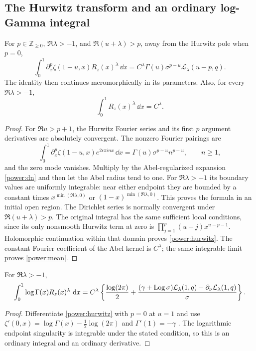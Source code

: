 \subsection{The Hurwitz transform and an ordinary log-Gamma integral}

\begin{theorem}\label{power:hurwitzthm}
For $p\in\mathbb Z_{\ge0}$, $\Re\lambda>-1$, and
$\Re(u+\lambda)>p$, away from the Hurwitz pole when $p=0$,
\begin{equation}\label{power:hurwitz}
 \boxed{\displaystyle
 \int_0^1\partial_x^p\zeta(1-u,x)R_z(x)^\lambda\,\dd x
 =C^\lambda\Gamma(u)\sigma^{p-u}
                    \mathcal L_\lambda(u-p,q).}
\end{equation}
The identity then continues meromorphically in its parameters.  Also,
for every $\Re\lambda>-1$,
\begin{equation}\label{power:mean}
 \int_0^1R_z(x)^\lambda\,\dd x=C^\lambda.
\end{equation}
\end{theorem}

\begin{proof}
For $\Re u>p+1$, the Hurwitz Fourier series and its first $p$
argument derivatives are absolutely convergent.  The nonzero Fourier
pairings are
\[
 \int_0^1\partial_x^p\zeta(1-u,x)e^{2\epsilon\pi inx}\,\dd x
     =\Gamma(u)\sigma^{p-u}n^{p-u},\qquad n\ge1,
\]
and the zero mode vanishes.  Multiply by the Abel-regularized expansion
\eqref{power:dn} and then let the Abel radius tend to one.
For $\Re\lambda>-1$ its boundary values are uniformly integrable:
near either endpoint they are bounded by a constant times
$x^{\min(\Re\lambda,0)}$ or $(1-x)^{\min(\Re\lambda,0)}$.
This proves the formula in an initial open region.  The Dirichlet
series is normally convergent under $\Re(u+\lambda)>p$.
The original integral has the same sufficient local conditions, since
its only nonsmooth Hurwitz term at zero is
$\prod_{j=1}^p(u-j)x^{u-p-1}$.  Holomorphic continuation within
that domain proves \eqref{power:hurwitz}.  The constant Fourier
coefficient of the Abel kernel is $C^\lambda$; the same integrable
limit proves \eqref{power:mean}.
\end{proof}

\begin{corollary}\label{power:gamma}
For $\Re\lambda>-1$,
\begin{align}\label{power:gammaformula}
 \int_0^1\log\Gamma(x)R_z(x)^\lambda\,\mathop{}\!\mathrm{d} x
 =C^\lambda\left\{\frac{\log(2\pi)}2
 +\frac{(\gamma+\operatorname{Log}\sigma)\mathcal L_\lambda(1,q)
       -\partial_\nu\mathcal L_\lambda(1,q)}{\sigma}\right\}.
\end{align}
\end{corollary}
\begin{proof}
Differentiate \eqref{power:hurwitz} with $p=0$ at $u=1$ and use
$\zeta'(0,x)=\log\Gamma(x)-\tfrac12\log(2\pi)$ and
$\Gamma'(1)=-\gamma$ \cite{DLMF}.
The logarithmic endpoint singularity is integrable under the stated
condition, so this is an ordinary integral and an ordinary derivative.
\end{proof}

